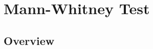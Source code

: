 \newpage
\section{Mann-Whitney Test}
\label{1SampleMannWhitneyTest}


\subsection{Overview}
\label{1SampleMannWhitneyTestOverview}

\lipsum[2]
%
%
%
%
%
%
%
%
%
%
%
%
%
%
%
%
%
%
%
%


